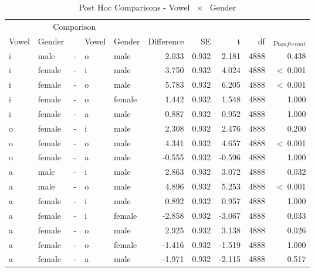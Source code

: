 \documentclass[a4paper,man,hidelinks,floatsintext]{apa7}
\begin{document}
    
\begin{table}[!htbp]
\caption{Post Hoc Comparisons - Vowel ~$\times$~ Gender}
\label{tab:Table_11}
\begin{adjustbox}{max size={\columnwidth}{\textheight}}
\centering
\begin{tabular}{llrllrrrrr}
\hline
\multicolumn{5}{c}{Comparison} & \multicolumn{5}{c}{~} \\
\cline{1-5}
Vowel & Gender & ~ & Vowel & Gender & Difference &    SE &      t &   df & p$_{bonferroni}$ \\
\hline
i     & male   & - & o     & male   &      2.033 & 0.932 &  2.181 & 4888 &            0.438 \\
i     & female & - & i     & male   &      3.750 & 0.932 &  4.024 & 4888 &  \textless~0.001 \\
i     & female & - & o     & male   &      5.783 & 0.932 &  6.205 & 4888 &  \textless~0.001 \\
i     & female & - & o     & female &      1.442 & 0.932 &  1.548 & 4888 &            1.000 \\
i     & female & - & a     & male   &      0.887 & 0.932 &  0.952 & 4888 &            1.000 \\
o     & female & - & i     & male   &      2.308 & 0.932 &  2.476 & 4888 &            0.200 \\
o     & female & - & o     & male   &      4.341 & 0.932 &  4.657 & 4888 &  \textless~0.001 \\
o     & female & - & a     & male   &     -0.555 & 0.932 & -0.596 & 4888 &            1.000 \\
a     & male   & - & i     & male   &      2.863 & 0.932 &  3.072 & 4888 &            0.032 \\
a     & male   & - & o     & male   &      4.896 & 0.932 &  5.253 & 4888 &  \textless~0.001 \\
a     & female & - & i     & male   &      0.892 & 0.932 &  0.957 & 4888 &            1.000 \\
a     & female & - & i     & female &     -2.858 & 0.932 & -3.067 & 4888 &            0.033 \\
a     & female & - & o     & male   &      2.925 & 0.932 &  3.138 & 4888 &            0.026 \\
a     & female & - & o     & female &     -1.416 & 0.932 & -1.519 & 4888 &            1.000 \\
a     & female & - & a     & male   &     -1.971 & 0.932 & -2.115 & 4888 &            0.517 \\
\hline
\end{tabular}
\end{adjustbox}
\begin{tablenotes} {
\small
}
\end{tablenotes}
\end{table}
      
\end{document}
